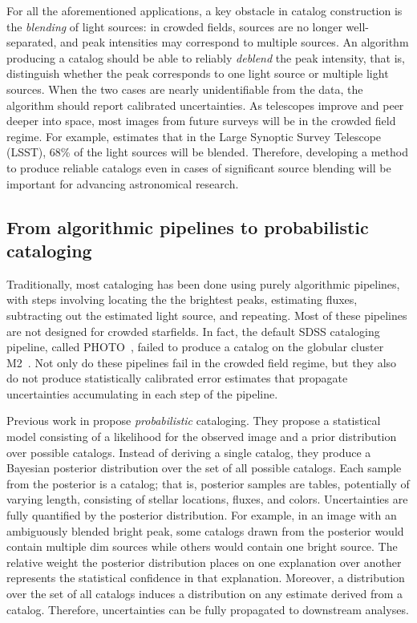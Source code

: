 For all the aforementioned applications, a key obstacle 
in catalog construction is the {\itshape blending} of light sources: in crowded fields, sources are no longer well-separated, and peak intensities may correspond to multiple sources. An algorithm producing a catalog should be able to reliably {\itshape deblend} the peak intensity, that is, distinguish whether the peak corresponds to one light source or 
multiple light sources. When the two cases are nearly unidentifiable from the data, the algorithm should 
report calibrated uncertainties. As telescopes improve and peer deeper into space, most images from future surveys will be in the crowded field regime. 
For example, \cite{Bosch_2017_LSST} estimates that in the Large Synoptic Survey Telescope (LSST), 68\% of the light sources will be blended. Therefore, developing a method to produce reliable catalogs even in cases of significant source blending will be important for advancing astronomical research. 

\subsection{From algorithmic pipelines to probabilistic cataloging}

Traditionally, most cataloging has been done using purely algorithmic pipelines, with steps involving locating the the brightest peaks, estimating fluxes, subtracting out the estimated light source, and repeating. 
Most of these pipelines are not designed for crowded starfields.
In fact, the default SDSS cataloging pipeline, called PHOTO~\cite{lupton2001sdss}, failed to 
produce a catalog on 
the globular cluster M2~\cite{Portillo_2017}. 
Not only do these pipelines fail in the crowded field
regime, but they also do not produce statistically calibrated error estimates that propagate 
uncertainties accumulating in each step of the pipeline. 

Previous work in \cite{Brewer_2013, Portillo_2017, Feder_2019}
propose {\itshape probabilistic} cataloging.
They propose a statistical model consisting of a likelihood for the observed image and a prior distribution over possible catalogs. Instead of deriving a single catalog, they produce a Bayesian posterior distribution over the set of all possible catalogs. 
Each sample from the posterior is a catalog; that is, posterior samples are tables, potentially of varying length, consisting of stellar locations, fluxes, and colors. 
Uncertainties are fully quantified by the posterior distribution. 
For example, in an image with an ambiguously blended bright peak, some catalogs drawn from the posterior would contain multiple dim sources while others would contain one bright source. 
The relative weight the posterior distribution places on one explanation over another represents the statistical confidence in that explanation. 
Moreover, a distribution over the set of all catalogs induces a distribution on any estimate derived from a catalog. Therefore, uncertainties can be fully propagated to downstream analyses.  

